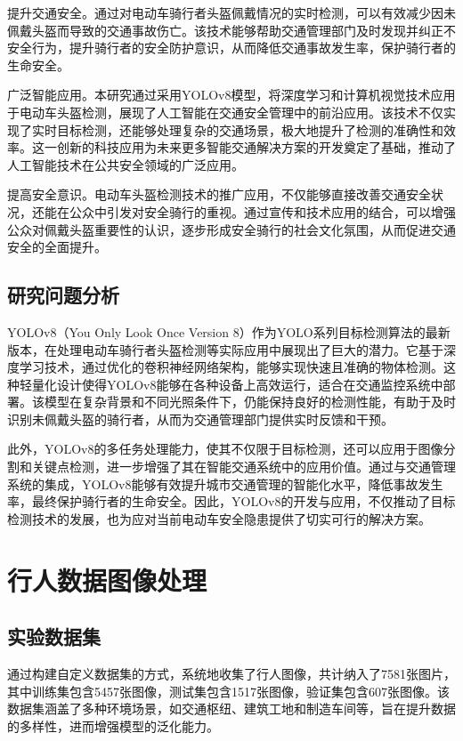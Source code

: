 \documentclass[journal]{IEEEtran}
\numberwithin{figure}{section}%
\begin{document}
提升交通安全。通过对电动车骑行者头盔佩戴情况的实时检测，可以有效减少因未佩戴头盔而导致的交通事故伤亡。该技术能够帮助交通管理部门及时发现并纠正不安全行为，提升骑行者的安全防护意识，从而降低交通事故发生率，保护骑行者的生命安全。\par
广泛智能应用。本研究通过采用YOLOv8模型，将深度学习和计算机视觉技术应用于电动车头盔检测，展现了人工智能在交通安全管理中的前沿应用。该技术不仅实现了实时目标检测，还能够处理复杂的交通场景，极大地提升了检测的准确性和效率。这一创新的科技应用为未来更多智能交通解决方案的开发奠定了基础，推动了人工智能技术在公共安全领域的广泛应用。\par
提高安全意识。电动车头盔检测技术的推广应用，不仅能够直接改善交通安全状况，还能在公众中引发对安全骑行的重视。通过宣传和技术应用的结合，可以增强公众对佩戴头盔重要性的认识，逐步形成安全骑行的社会文化氛围，从而促进交通安全的全面提升。\par

\subsection{研究问题分析}
YOLOv8（You Only Look Once Version 8）作为YOLO系列目标检测算法的最新版本，在处理电动车骑行者头盔检测等实际应用中展现出了巨大的潜力。它基于深度学习技术，通过优化的卷积神经网络架构，能够实现快速且准确的物体检测。这种轻量化设计使得YOLOv8能够在各种设备上高效运行，适合在交通监控系统中部署。该模型在复杂背景和不同光照条件下，仍能保持良好的检测性能，有助于及时识别未佩戴头盔的骑行者，从而为交通管理部门提供实时反馈和干预。\par
此外，YOLOv8的多任务处理能力，使其不仅限于目标检测，还可以应用于图像分割和关键点检测，进一步增强了其在智能交通系统中的应用价值。通过与交通管理系统的集成，YOLOv8能够有效提升城市交通管理的智能化水平，降低事故发生率，最终保护骑行者的生命安全。因此，YOLOv8的开发与应用，不仅推动了目标检测技术的发展，也为应对当前电动车安全隐患提供了切实可行的解决方案。
\section{行人数据图像处理}
\subsection{实验数据集}
通过构建自定义数据集的方式，系统地收集了行人图像，共计纳入了7581张图片，其中训练集包含5457张图像，测试集包含1517张图像，验证集包含607张图像。该数据集涵盖了多种环境场景，如交通枢纽、建筑工地和制造车间等，旨在提升数据的多样性，进而增强模型的泛化能力。\par
\end{document}
